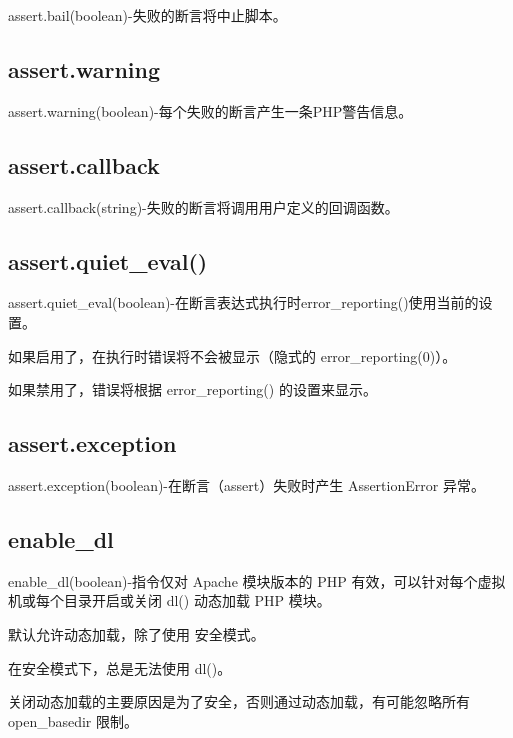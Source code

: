 assert.bail(boolean)-失败的断言将中止脚本。

\subsection{assert.warning}

assert.warning(boolean)-每个失败的断言产生一条PHP警告信息。

\subsection{assert.callback}

assert.callback(string)-失败的断言将调用用户定义的回调函数。

\subsection{assert.quiet\_eval()}

assert.quiet\_eval(boolean)-在断言表达式执行时error\_reporting()使用当前的设置。

\begin{compactitem}
\item 如果启用了，在执行时错误将不会被显示（隐式的 error\_reporting(0)）。
\item 如果禁用了，错误将根据 error\_reporting() 的设置来显示。
\end{compactitem}


\subsection{assert.exception}

assert.exception(boolean)-在断言（assert）失败时产生 AssertionError 异常。


\subsection{enable\_dl}

enable\_dl(boolean)-指令仅对 Apache 模块版本的 PHP 有效，可以针对每个虚拟机或每个目录开启或关闭 dl() 动态加载 PHP 模块。

\begin{compactitem}
\item 默认允许动态加载，除了使用 安全模式。
\item 在安全模式下，总是无法使用 dl()。
\end{compactitem}




关闭动态加载的主要原因是为了安全，否则通过动态加载，有可能忽略所有 open\_basedir 限制。

